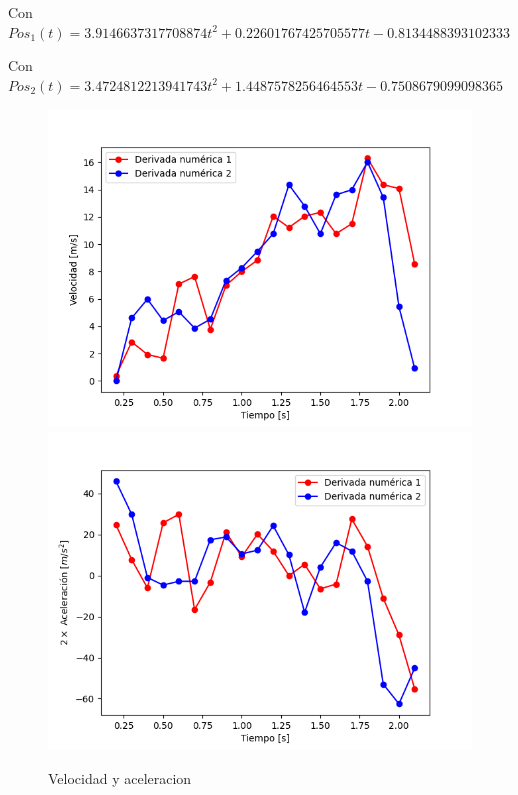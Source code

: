 \documentclass[12pt,a4]{article}
\begin{document}
Con $Pos_1(t) = 3.9146637317708874 t^2 + 0.22601767425705577 t - 0.8134488393102333$

Con $Pos_2(t) = 3.4724812213941743 t^2 + 1.4487578256464553 t - 0.7508679099098365$

\begin{figure}[H]
    \centering
    \includegraphics[width=0.4\linewidth]{velocidad_PapelPapelM_O.png}
    \includegraphics[width=0.4\linewidth]{aceleracion_PapelPapelM_O.png}
    \caption{Velocidad y aceleracion}
    \label{fig:vaPPM_O}
\end{figure}
\end{document}
